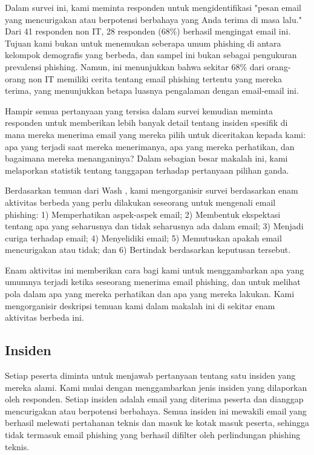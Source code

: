 \documentclass[lettersize,journal]{IEEEtran}
\begin{document}
Dalam survei ini, kami meminta responden untuk mengidentifikasi "pesan email
yang mencurigakan atau berpotensi berbahaya yang Anda terima di masa lalu."
Dari 41 responden non IT, 28 responden (68\%) berhasil mengingat email ini.
Tujuan kami bukan untuk menemukan seberapa umum phishing di antara kelompok
demografis yang berbeda, dan sampel ini bukan sebagai pengukuran prevalensi
phishing. Namun, ini menunjukkan bahwa sekitar 68\% dari orang-orang non IT
memiliki cerita tentang email phishing tertentu yang mereka terima, yang
menunjukkan betapa luasnya pengalaman dengan email-email ini.

Hampir semua pertanyaan yang tersisa dalam survei kemudian meminta responden
untuk memberikan lebih banyak detail tentang insiden spesifik di mana mereka
menerima email yang mereka pilih untuk diceritakan kepada kami: apa yang
terjadi saat mereka menerimanya, apa yang mereka perhatikan, dan bagaimana
mereka menanganinya? Dalam sebagian besar makalah ini, kami melaporkan
statistik tentang tanggapan terhadap pertanyaan pilihan ganda.

Berdasarkan temuan dari Wash \cite{tigaempat}, kami mengorganisir survei
berdasarkan enam aktivitas berbeda yang perlu dilakukan seseorang untuk
mengenali email phishing: 1) Memperhatikan aspek-aspek email; 2) Membentuk
ekspektasi tentang apa yang seharusnya dan tidak seharusnya ada dalam email; 3)
Menjadi curiga terhadap email; 4) Menyelidiki email; 5) Memutuskan apakah email
mencurigakan atau tidak; dan 6) Bertindak berdasarkan keputusan tersebut.

Enam aktivitas ini memberikan cara bagi kami untuk menggambarkan apa yang
umumnya terjadi ketika seseorang menerima email phishing, dan untuk melihat
pola dalam apa yang mereka perhatikan dan apa yang mereka lakukan. Kami
mengorganisir deskripsi temuan kami dalam makalah ini di sekitar enam aktivitas
berbeda ini.

\subsection{Insiden}

Setiap peserta diminta untuk menjawab pertanyaan tentang satu insiden yang
mereka alami. Kami mulai dengan menggambarkan jenis insiden yang dilaporkan
oleh responden. Setiap insiden adalah email yang diterima peserta dan dianggap
mencurigakan atau berpotensi berbahaya. Semua insiden ini mewakili email yang
berhasil melewati pertahanan teknis dan masuk ke kotak masuk peserta, sehingga
tidak termasuk email phishing yang berhasil difilter oleh perlindungan phishing
teknis.
\end{document}
